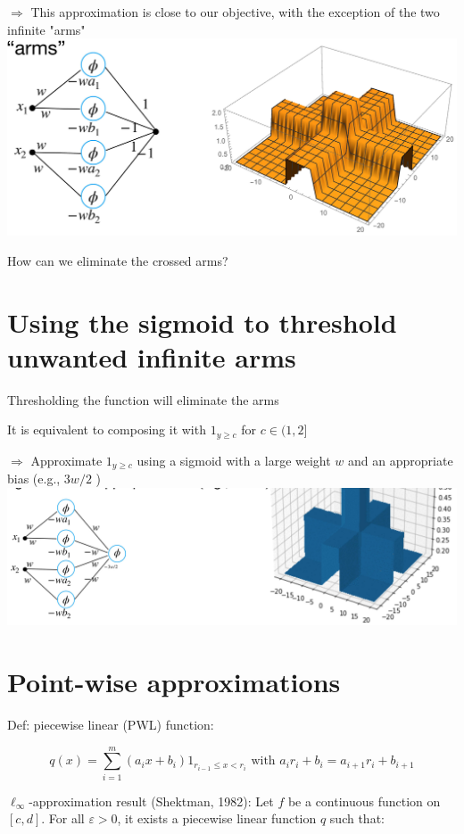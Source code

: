 \documentclass[10pt]{article}
\begin{document}
$\Rightarrow$ This approximation is close to our objective, with the exception of the two infinite "arms"
\includegraphics[max width=\textwidth, center]{2024_01_08_0e0dcffe4bc8c6049046g-30}

How can we eliminate the crossed arms?

\section*{Using the sigmoid to threshold unwanted infinite arms}
Thresholding the function will eliminate the arms

It is equivalent to composing it with $1_{y \geq c}$ for $c \in(1,2]$

$\Rightarrow$ Approximate $1_{y \geq c}$ using a sigmoid with a large weight $w$ and an appropriate bias (e.g., $3 w / 2$ )
\includegraphics[max width=\textwidth, center]{2024_01_08_0e0dcffe4bc8c6049046g-31}

\section*{Point-wise approximations}
Def: piecewise linear (PWL) function:

$$
q(x)=\sum_{i=1}^{m}\left(a_{i} x+b_{i}\right) 1_{r_{i-1} \leq x<r_{i}} \text { with } a_{i} r_{i}+b_{i}=a_{i+1} r_{i}+b_{i+1}
$$

$\ell_{\infty}$-approximation result (Shektman, 1982): Let $f$ be a continuous function on $[c, d]$. For all $\varepsilon>0$, it exists a piecewise linear function $q$ such that:
\end{document}

